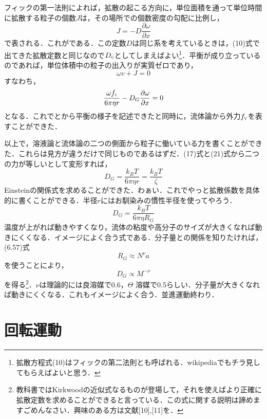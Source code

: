 \documentclass{jsarticle}
\begin{document}
フィックの第一法則によれば，拡散の起こる方向に，単位面積を通って単位時間に拡散する粒子の個数$J$は，その場所での個数密度の勾配に比例し，
\begin{equation}
J=-D\frac{\partial \omega}{\partial x}
\end{equation}
で表される．これがである．この定数$D$は同じ系を考えているときは，(10)式で出てきた拡散定数と同じなので$D_{\scalebox{0.5}{G}}$としてしまえばよい\footnote{拡散方程式(10)はフィックの第二法則とも呼ばれる．wikipediaでもチラ見してもらえばよいと思う．}．平衡が成り立っているのであれば，単位体積中の粒子の出入りが実質ゼロであり，
\begin{equation}
\omega v+J=0
\end{equation}
すなわち，
\begin{equation}
\frac{\omega f_{\scalebox{0.5}{V}}}{6\pi \eta r}-D_G\frac{\partial \omega}{\partial x}=0
\end{equation}
となる．これでとから平衡の様子を記述できたと同時に，流体論から外力$f_{\scalebox{0.5}{V}}$を表すことができた．

以上で，溶液論と流体論の二つの側面から粒子に働いている力を書くことができた．これらは見方が違うだけで同じものであるはずだ．(17)式と(21)式から二つの力が等しいとして変形すれば，
\begin{equation}
D_G=\frac{k_B T}{6\pi \eta r}=\frac{k_B T}{\zeta}
\end{equation}
Einsteinの関係式を求めることができた．わぁい．これでやっと拡散係数を具体的に書くことができる．半径$r$にはお馴染みの慣性半径を使ってやろう．
\begin{equation}
D_G=\frac{k_B T}{6\pi \eta R_G}
\end{equation}
温度が上がれば動きやすくなり，流体の粘度や高分子のサイズが大きくなれば動きにくくなる．イメージによく合う式である．分子量との関係を知りたければ，(6.57)式
\begin{equation}
R_G \approx N^\nu a
\end{equation}
を使うことにより，
\begin{equation}
D_G \propto M^{- \nu}
\end{equation}
を得る\footnote{教科書ではKirkwoodの近似式なるものが登場して，それを使えばより正確に拡散定数を求めることができると言っている．この式に関する説明は諦めますごめんなさい．興味のある方は文献[10],[11]を．}．$\nu$は理論的には良溶媒で0.6，$\Theta$ 溶媒で0.5らしい．分子量が大きくなれば動きにくくなる．これもイメージによく合う．並進運動終わり．

\section{回転運動}
\end{document}
